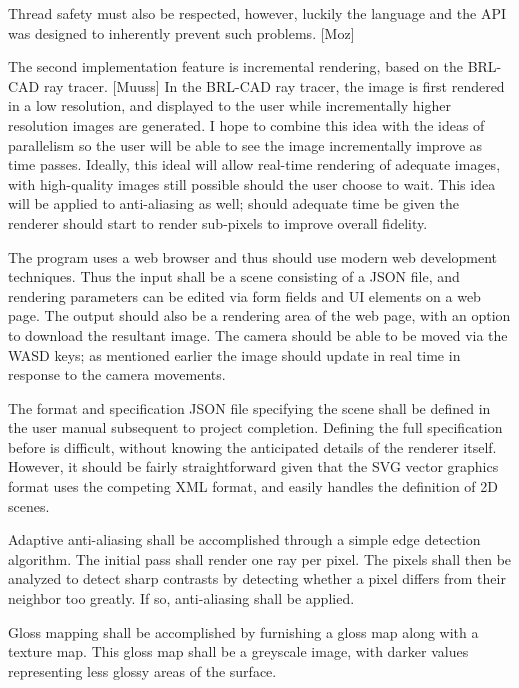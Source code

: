 \documentclass[12pt]{article}
\begin{document}
\begin{description}
    Thread safety must also be respected, however, luckily the language
    and the API was designed to inherently prevent such problems. [Moz]
    
    The second implementation feature is incremental rendering, based on the
    BRL-CAD ray tracer. [Muuss] In the BRL-CAD ray tracer, the image
    is first rendered in a low resolution, and displayed to the user while incrementally
    higher resolution images are generated. I hope to combine this idea with the ideas
    of parallelism so the user will be able to see the image incrementally improve
    as time passes. Ideally, this ideal will allow real-time rendering of adequate
    images, with high-quality images still possible should the user choose to wait.
    This idea will be applied to anti-aliasing as well; should adequate time be
    given the renderer should start to render sub-pixels to improve overall fidelity.
    
    The program uses a web browser and thus should use modern web development techniques.
    Thus the input shall be a scene consisting of a JSON file, and rendering parameters
    can be edited via form fields and UI elements on a web page. The output should also
    be a rendering area of the web page, with an option to download the resultant image.
    The camera should be able to be moved via the WASD keys; as mentioned earlier
    the image should update in real time in response to the camera movements.
    
    The format and specification JSON file specifying the scene shall be defined in the 
    user manual subsequent to project completion. Defining the full specification
    before is difficult, without knowing the anticipated details of the renderer itself.
    However, it should be fairly straightforward given that the SVG vector graphics
    format uses the competing XML format, and easily handles the definition of
    2D scenes.
    
    Adaptive anti-aliasing shall be accomplished through a simple edge detection
    algorithm. The initial pass shall render one ray per pixel. The pixels shall then
    be analyzed to detect sharp contrasts by detecting whether a pixel differs from
    their neighbor too greatly. If so, anti-aliasing shall be applied.
    
    Gloss mapping shall be accomplished by furnishing a gloss map along with a
    texture map. This gloss map shall be a greyscale image, with darker values
    representing less glossy areas of the surface.
    

\end{description}
\end{document}
